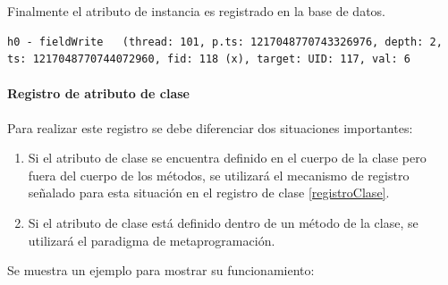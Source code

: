 \documentclass[12pt,legalpaper]{report}
\begin{document}
Finalmente el atributo de instancia es registrado en la base de datos.

\begin{singlespace}
\begin{lstlisting}[style=consola,numbers=none]
h0 - fieldWrite   (thread: 101, p.ts: 1217048770743326976, depth: 2, ts: 1217048770744072960, fid: 118 (x), target: UID: 117, val: 6
\end{lstlisting}
\end{singlespace}


				\paragraph{Registro de atributo de clase\label{registerStaticField}}

Para realizar este registro se debe diferenciar dos situaciones importantes:
\begin{enumerate}
	\item Si el atributo de clase se encuentra definido en el cuerpo de la clase pero fuera del cuerpo de los métodos, se utilizará el mecanismo de registro señalado para esta situación en el registro de clase \ref{registroClase}.
	\item Si el atributo de clase está definido dentro de un método de la clase, se utilizará el paradigma de metaprogramación.
\end{enumerate}

Se muestra un ejemplo para mostrar su funcionamiento:
\end{document}
